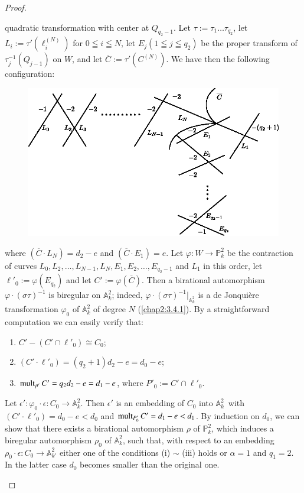 \begin{proof}
\begin{enumerate}
quadratic transformation with center at $Q_{q_{2}-1}$. Let
$\tau:=\tau_{1}\ldots \tau_{q_{2}}$, let
$L_{i}:=\tau'(\ell^{(N)}_{i})$ for $0\leqq i\leqq N$, let
$E_{j}(1\leqq j\leqq q_{2})$ be the proper transform of
$\tau^{-1}_{j}(Q_{j-1})$ on $W$, and let
$\overline{C}:=\tau'(C^{(N)})$. We have then the following
configuration:
\begin{figure}[H]
\centering
\includegraphics{figures/chap2-fig8.eps}
\end{figure}
where $(\overline{C}\cdot L_{N})=d_{2}-e$ and $(\overline{C}\cdot
E_{1})=e$. Let $\varphi:W\to \mathbb{P}^{2}_{k}$ be the contraction of
curves
$L_{0},L_{2},\ldots,L_{N-1},L_{N},E_{1},E_{2},\ldots,E_{q_{2}-1}$ and
$L_{1}$ in this order, let $\ell'_{0}:=\varphi(E_{q_{2}})$ and let
$C':=\varphi(\overline{C})$. Then a birational automorphism
$\varphi\cdot (\sigma\tau)^{-1}$ is biregular on $\mathbb{A}^{2}_{k}$;
indeed, $\varphi\cdot (\sigma\tau)^{-1}|_{\mathbb{A}^{2}_{k}}$ is a de
Jonqui\`ere transformation $\varphi_{0}$ of $\mathbb{A}^{2}_{k}$ of
degree $N$ (\cf \ref{chap2:3.4.1}). By a straightforward computation we can
easily verify that:
\begin{enumerate}
\renewcommand{\theenumii}{\arabic{enumii}}
\renewcommand{\labelenumii}{(\theenumii)}
\item $C'-(C'\cap \ell'_{0})\cong C_{0}$;

\item $(C'\cdot\ell'_{0})=(q_{2}+1)d_{2}-e=d_{0}-e$;

\item $\operatorname{mult}_{p'}C'=q_{2}d_{2}-e=d_{1}-e$, where $P'_{0}:=C'\cap \ell'_{0}$.
\end{enumerate}
Let $\epsilon':\varphi_{0}\cdot\epsilon:C_{0}\to\mathbb{A}^{2}_{k}$. Then
$\epsilon'$ is an embedding of $C_{0}$ into
$\mathbb{A}^{2}_{k}$\pageoriginale\ with $(C'\cdot
\ell'_{0})=d_{0}-e<d_{0}$ and $\operatorname{mult}_{P'_{0}}C'=d_{1}-e<d_{1}$. By
induction on $d_{0}$, we can show that there exists a
birational automorphism $\rho$ of $\mathbb{P}^{2}_{k}$, which induces a
biregular automorphism $\rho_{0}$ of $\mathbb{A}^{2}_{k}$, such that,
with respect to an embedding $\rho_{0}\cdot \epsilon:C_{0}\to
\mathbb{A}^{2}_{k'}$ either one of the conditions (i) $\sim$ (iii)
holds or $\alpha=1$ and $q_{1}=2$. In the latter case $d_{0}$ becomes
smaller than the original one.


\end{enumerate}
\end{proof}

